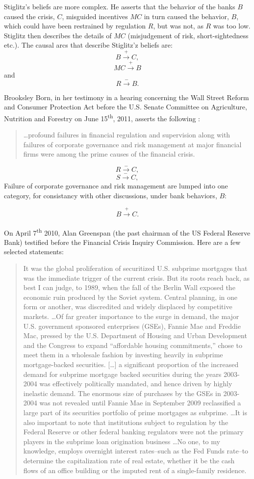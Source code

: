 \documentclass[12pt]{article}
\newcommand{\ts}{\textsuperscript}
\begin{document}
Stiglitz's beliefs are more complex. He asserts that the behavior of the banks $B$ caused the crisis, $C$, misguided incentives $MC$ in turn caused the behavior, $B$, which could have been restrained by regulation $R$, but was not, as $R$ was too low. Stiglitz then describes the details of $MC$ (misjudgement of risk, short-sightedness etc.). The causal arcs that describe Stiglitz'z beliefs are:
$$B \xrightarrow{+} C,$$
$$MC \xrightarrow{+} B$$
and
$$R \xrightarrow{-}B.$$

Brooksley Born, in her testimony in a hearing concerning the Wall Street Reform and Consumer Protection Act before the U.S. Senate Committee on Agriculture, Nutrition and Forestry on June 15\ts{th}, 2011, asserts the following :
\begin{quotation}
\ldots profound failures in financial regulation and supervision along with failures of corporate governance and risk management at major financial firms  were among the prime causes of the financial crisis.
\end{quotation}
$$R \xrightarrow{-} C,$$
$$S \xrightarrow{-} C,$$
Failure of corporate governance and risk management are lumped into one category, for consistancy with other discussions, under bank behaviors, $B$:

$$B \xrightarrow{+} C.$$\\

On April 7\ts{th} 2010, Alan Greenspan (the past chairman of the US Federal Reserve Bank) testified before the Financial Crisis Inquiry Commission. Here are a few selected statements:

\begin{quotation}
It was the global proliferation of securitized U.S. subprime mortgages that was the immediate trigger of the current crisis. But its roots reach back, as best I can judge, to 1989, when the fall of the Berlin Wall exposed the economic ruin produced by the Soviet system. Central planning, in one form or another, was discredited and widely displaced by competitive markets. \ldots Of far greater importance to the surge in demand, the major U.S. government sponsored enterprises (GSEs), Fannie Mae and Freddie Mac, pressed by the U.S. Department of Housing and Urban Development and the Congress to expand ``affordable housing commitments,'' chose to meet them in a wholesale fashion by investing heavily in subprime mortgage-backed securities. [\ldots] a significant proportion of the increased demand for subprime mortgage backed securities during the years 2003-2004 was effectively politically mandated, and hence driven by highly inelastic demand. The enormous size of purchases by the GSEs in 2003-2004 was not revealed until Fannie Mae in September 2009 reclassified a large part of its securities portfolio of prime mortgages as subprime. \ldots It is also important to note that institutions subject to regulation by the Federal Reserve or other federal banking regulators were not the primary players in the subprime loan origination business \ldots No one, to my knowledge, employs overnight interest rates--such as the Fed Funds rate--to determine the
capitalization rate of real estate, whether it be the cash flows of an office building or the imputed rent of a single-family residence.
\end{quotation}
\end{document}

